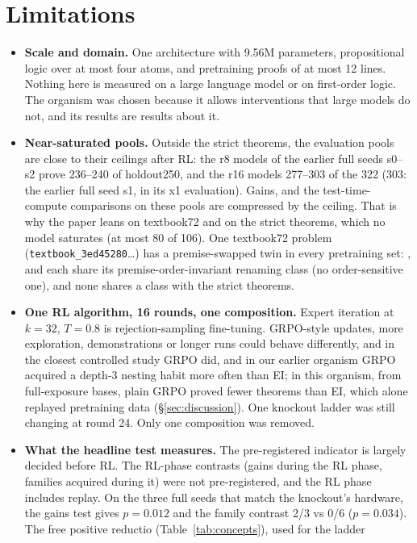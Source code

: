 \section{Limitations}
\label{sec:limits}

\begin{itemize}
\item \textbf{Scale and domain.} One architecture with 9.56M parameters, propositional logic over at most four atoms,
and pretraining proofs of at most 12 lines. Nothing here is measured on a large language model or on first-order logic.
The organism was chosen because it allows interventions that large models do not, and its results are results about
it.
\item \textbf{Near-saturated pools.} Outside the strict theorems, the evaluation pools are close to their ceilings
after RL: the r8 models of the earlier full seeds s0--s2 prove 236--240 of holdout250, and the r16 models 277--303
of the 322 (303: the earlier full seed s1, in its x1 evaluation). Gains, \dcov{} and the
test-time-compute comparisons on these pools are compressed by the ceiling. That is why the paper leans on textbook72
and on the strict theorems, which no model saturates (at most 80 of 106). One textbook72 problem
(\texttt{textbook\_3ed45280}\ldots) has a premise-swapped twin in every pretraining set: \KT{}, \KTko{} and \KTdose{}
each share its premise-order-invariant renaming class (no order-sensitive one), and none shares a class with the strict
theorems.
\item \textbf{One RL algorithm, 16 rounds, one composition.} Expert iteration at $k=32$, $T=0.8$ is rejection-sampling
fine-tuning. GRPO-style updates, more exploration, demonstrations or longer runs could behave differently, and in the
closest controlled study GRPO did, and in our earlier organism GRPO acquired a depth-3 nesting habit more often than EI;
in this organism, from full-exposure bases, plain GRPO proved fewer theorems than EI, which alone replayed pretraining
data (\S\ref{sec:discussion}). One knockout ladder was still
changing at round 24. Only one composition was removed.
\item \textbf{What the headline test measures.} The pre-registered indicator is largely decided before RL. The RL-phase
contrasts (gains during the RL phase, families acquired during it) were not pre-registered, and the RL phase includes
replay. On the three full seeds that match the knockout's hardware, the gains test gives $p = 0.012$ and the family
contrast 2/3 vs 0/6 ($p = 0.034$). The free positive reductio (Table~\ref{tab:concepts}), used for the ladder

\end{itemize}
